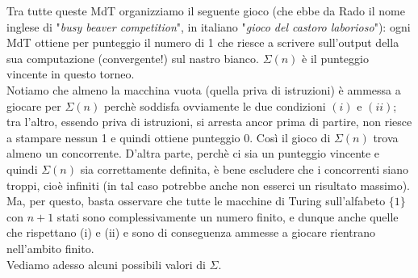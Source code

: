 Tra tutte queste MdT
organizziamo il seguente gioco (che ebbe da Rado il nome inglese di "\textit{busy beaver
    competition}", in italiano "\textit{gioco del castoro laborioso}"):
ogni MdT ottiene per punteggio il numero di 1 che riesce a scrivere sull'output della
sua computazione (convergente!) sul nastro bianco. $\Sigma(n)$ è il punteggio
vincente in questo torneo.\\
Notiamo che almeno la macchina vuota (quella priva di
istruzioni) è ammessa a giocare per $\Sigma(n)$ perchè soddisfa ovviamente le due
condizioni $(i)$ e $(i i)$; tra l'altro, essendo priva di istruzioni, si arresta
ancor prima di partire, non riesce a stampare nessun 1 e quindi ottiene punteggio 0.
Così il gioco di $\Sigma(n)$ trova almeno un concorrente. D'altra parte, perchè ci
sia un punteggio vincente e quindi $\Sigma(n)$ sia correttamente definita, è bene
escludere che i concorrenti siano troppi, cioè infiniti (in tal caso potrebbe anche
non esserci un risultato massimo). Ma, per questo, basta osservare che tutte le
macchine di Turing sull'alfabeto $\{1\}$ con $n+1$ stati sono complessivamente un
numero finito, e dunque anche quelle che rispettano (i) e (ii) e sono di conseguenza
ammesse a giocare rientrano nell'ambito finito.\\
Vediamo adesso alcuni possibili valori di $\Sigma$.
